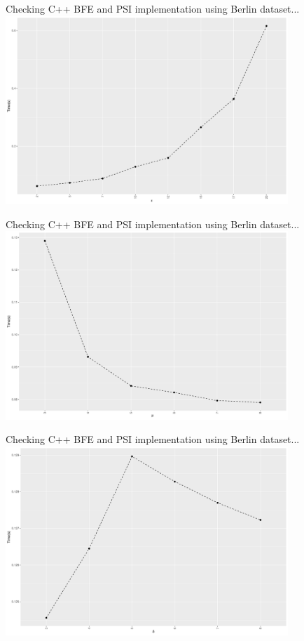 \documentclass{beamer}
\begin{document}
\begin{frame}{Checking C++ BFE and PSI implementation using Berlin dataset...}
    \centering
    \includegraphics[width=0.8\textwidth]{scripts/epsilon_benchmark}
\end{frame}
\begin{frame}{Checking C++ BFE and PSI implementation using Berlin dataset...}
    \centering
    \includegraphics[width=0.8\textwidth]{scripts/mu_benchmark}
\end{frame}
\begin{frame}{Checking C++ BFE and PSI implementation using Berlin dataset...}
    \centering
    \includegraphics[width=0.8\textwidth]{scripts/delta_benchmark}
\end{frame}
\end{document}
